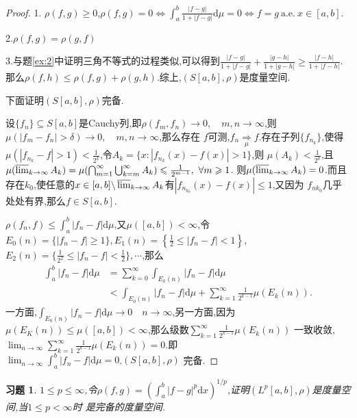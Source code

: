 \documentclass[a4paper,oneside,12pt]{ctexart}
\theoremstyle{plain}
\newtheorem{exercise}{习题}
\theoremstyle{nonumberplain}
\theoremstyle{nonumberplain}
\newtheorem{proof}{证明.}
\newcommand{\dif}{\mathrm{d}}
\newcommand{\differ}{\backslash}
\newcommand{\abs}[1]{\left\vert#1\right\vert}
\renewcommand{\limsup}{\varlimsup}
\renewcommand{\ae}{\ \mathrm{a.e.}\ }
\newcommand{\toinmeasure}[1]{\underset{#1}{\Rightarrow}}
\begin{document}
\begin{proof}
    1. $\rho(f,g)\geqslant 0$,$\rho(f,g)=0\Leftrightarrow \int_a^b\frac{\abs{f-g}}{1+\abs{f-g}}\dif \mu=0\Leftrightarrow f=g \ae x\in[a,b]$.

    2.$\rho(f,g)=\rho(g,f)$

    3.与题\eqref{ex:2}中证明三角不等式的过程类似,可以得到$\frac{\abs{f-g}}{1+\abs{f-g}}+\frac{\abs{g-h}}{1+\abs{g-h}}\geqslant\frac{\abs{f-h}}{1+\abs{f-h}}$.
    那么$\rho(f,h)\leqslant\rho(f,g)+\rho(g,h)$.综上,$(S[a,b],\rho)$是度量空间.

    下面证明$(S[a,b],\rho)$完备.

    设$\{f_n\}\subseteq S[a,b]$是Cauchy列,即$\rho(f_m,f_n)\to 0,\quad m,n\to\infty$,则$\mu(\abs{f_m-f_n}>\delta)\to 0,\quad m,n\to\infty$,那么存在
    $f$可测,$f_n\toinmeasure{\mu} f$.存在子列$\{f_{n_k}\}$,使得$\mu(\abs{f_{n_k}-f}>1)<\frac{1}{2^k}$,令$A_k=\{x:\abs{f_{n_k}(x)-f(x)}>1\}$,则
    $\mu(A_{k})<\frac{1}{2^k}$,且$\mu(\limsup_{k\to\infty} A_k)=\mu(\bigcap_{m=1}^\infty\bigcup_{k=m}^\infty A_k)\leqslant \frac{1}{2^{m-1}},\ \forall m\geqslant 1$.
    则$\mu(\limsup_{k\to\infty} A_k)=0$.而且存在$k_0$,使任意的$x\in[a,b]\differ\limsup_{k\to\infty} A_k$有$\abs{f_{n_{k_0}}(x)-f(x)}\leqslant 1$,又因为
    $f_{n{k_0}}$几乎处处有界,那么$f\in S[a,b]$.

    $\rho(f_n,f)\leqslant\int_a^b\abs{f_n-f}\dif \mu$,又$\mu([a,b])<\infty$,令$E_0(n)=\{\abs{f_n-f}\geqslant 1\},E_1(n)=\left\{\frac{1}{2}\leqslant\abs{f_n-f}<1\right\}$,
    $E_2(n)=\{\frac{1}{2^2}\leqslant\abs{f_n-f}<\frac{1}{2}\},\cdots$,那么 
    \begin{align*}
        \int_a^b\abs{f_n-f}\dif \mu&=\sum_{k=0}^\infty \int_{E_k(n)}\abs{f_n-f}\dif \mu\\
        &<\int_{E_0(n)}\abs{f_n-f}\dif \mu+\sum_{k=1}^\infty\frac{1}{2^{k-1}}\mu(E_k(n)).
    \end{align*}
一方面,$\int_{E_0(n)}\abs{f_n-f}\dif \mu\to 0\quad n\to\infty$,另一方面,因为$\mu(E_K(n))\leqslant\mu([a,b])<\infty$,那么级数$\sum_{k=1}^\infty \frac{1}{2^{k-1}}\mu(E_k(n))$
一致收敛,$\lim_{n\to\infty}\sum_{k=1}^\infty \frac{1}{2^{k-1}}\mu(E_k(n))=0$.即\\$\lim_{n\to\infty}\int_a^b\abs{f_n-f}\dif\mu=0$.$(S[a,b],\rho)$
完备.
\end{proof}

\begin{exercise}
    \label{ex:4}
    $1\leqslant p\leqslant \infty$,令$\rho(f,g)=\left(\int_a^b\abs{f-g}^p\dif x\right)^{1/p}$,证明$(L^p[a,b],\rho)$是度量空间,当$1\leqslant p<\infty$时
    是完备的度量空间.
\end{exercise}
\end{document}
